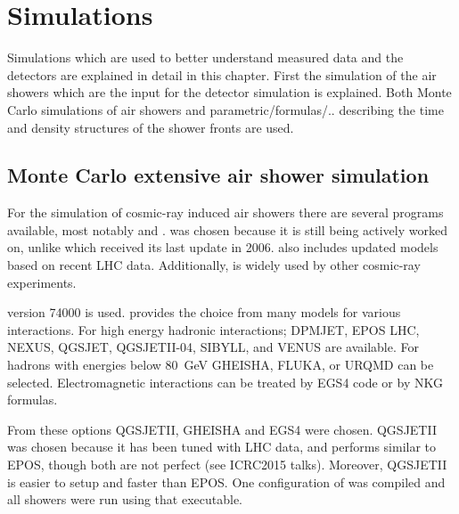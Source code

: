 \chapter{Simulations} \label{ch:simulations}

Simulations which are used to better understand measured data and the
detectors are explained in detail in this chapter. First the simulation
of the air showers which are the input for the detector simulation is
explained. Both Monte Carlo simulations of air showers and
parametric/formulas/.. describing the time and density structures of the
shower fronts are used.


\section{Monte Carlo extensive air shower simulation}

For the simulation of cosmic-ray induced air showers there are several
programs available, most notably \corsika and \aires\cite{sciutto1999}.
\corsika was chosen because it is still being actively worked on, unlike
\aires which received its last update in 2006. \corsika also includes
updated models based on recent LHC data. Additionally, \corsika is widely
used by other cosmic-ray experiments.

\corsika version 74000 is used. \corsika provides the choice from many
models for various interactions. For high energy hadronic interactions;
DPMJET, EPOS LHC\cite{pierog2013}, NEXUS, QGSJET,
QGSJETII-04\cite{ostapchenko2013}, SIBYLL, and VENUS are available. For
hadrons with energies below \SI{80}{\giga\electronvolt}
GHEISHA\cite{fesefeldt1985}, FLUKA, or URQMD can be selected.
Electromagnetic interactions can be treated by EGS4\cite{egs4} code or
by NKG formulas.

From these options QGSJETII, GHEISHA and EGS4 were chosen. QGSJETII was chosen
because it has been tuned with LHC data, and performs similar to EPOS, though
both are not perfect (see ICRC2015 talks). Moreover, QGSJETII is easier to
setup and faster than EPOS. One configuration of \corsika was compiled and all
showers were run using that executable.

%
%



